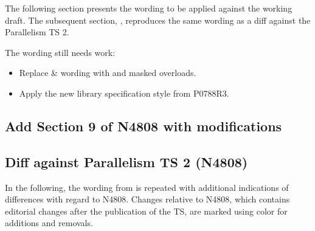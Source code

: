 The following section presents the wording to be applied against the \CC{}
working draft.
The subsequent section, , reproduces the same wording as a diff
against the Parallelism TS 2.

The wording still needs work:
\begin{itemize}
  \item Replace  \&  wording with  and masked overloads.
  \item Apply the new library specification style from P0788R3.
\end{itemize}

\subsection{Add Section 9 of N4808 with modifications}\label{sec:wording}

\begin{wgText}
  \def\wgRem#1{}
  \def\wgItemAdd{\item}
  \newsavebox{\wgVoid}
  \def\wgAdd#1{#1}
  \def\wgChange#1#2{#2}
  \def\diffbreak#1{}
  \setcounter{WGClause}{28}
  \setcounter{WGSubSection}{8}
  
\end{wgText}

\subsection{Diff against Parallelism TS 2 (N4808)}\label{sec:diff}

In the following, the wording from  is repeated with additional indications of differences with regard to N4808.
Changes relative to N4808, which contains editorial changes after the publication of the TS, are marked using color for \textcolor{WgAdd}{additions} and \textcolor{WgRem}{removals}.

\def\wgLabelPrefix{diff}%
\begin{wgText}
  \setcounter{WGClause}{28}
  \setcounter{WGSubSection}{8}
  \makeatletter
  \let\@tmp@seebelow=\seebelow
  \def\seebelow{\mbox{\@tmp@seebelow}}
  \let\@tmp@impdef=\impdef
  \def\impdef{\mbox{\@tmp@impdef}}
    \newcount\diffbreak@count
    \def\diffbreak#1{
      \\\diffbreak@count=\z@%
      \hbox{\@whilenum\diffbreak@count<#1\do{\ \advance\diffbreak@count\@ne}}%
    }
  \makeatother
  
\end{wgText}
